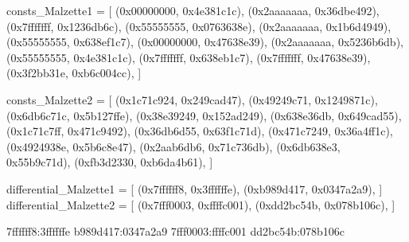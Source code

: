 consts_Malzette1 = [
    (0x00000000, 0x4e381c1c),
    (0x2aaaaaaa, 0x36dbe492),
    (0x7fffffff, 0x1236db6c),
    (0x55555555, 0x0763638e),
    (0x2aaaaaaa, 0x1b6d4949),
    (0x55555555, 0x638ef1c7),
    (0x00000000, 0x47638e39),
    (0x2aaaaaaa, 0x5236b6db),
    (0x55555555, 0x4e381c1c),
    (0x7fffffff, 0x638eb1c7),
    (0x7fffffff, 0x47638e39),
    (0x3f2bb31e, 0xb6c004cc),
]

consts_Malzette2 = [
    (0x1c71c924, 0x249cad47),
    (0x49249c71, 0x1249871c),
    (0x6db6c71c, 0x5b127ffe),
    (0x38e39249, 0x152ad249),
    (0x638e36db, 0x649cad55),
    (0x1c71c7ff, 0x471c9492),
    (0x36db6d55, 0x63f1c71d),
    (0x471c7249, 0x36a4ff1c),
    (0x4924938e, 0x5b6c8e47),
    (0x2aab6db6, 0x71c736db),
    (0x6db638e3, 0x55b9c71d),
    (0xfb3d2330, 0xb6da4b61),
]

differential_Malzette1 = [
    (0x7ffffff8, 0x3ffffffe),
    (0xb989d417, 0x0347a2a9),
]
differential_Malzette2 = [
    (0x7fff0003, 0xffffc001),
    (0xdd2bc54b, 0x078b106c),
]

7ffffff8:3ffffffe
b989d417:0347a2a9
7fff0003:ffffc001
dd2bc54b:078b106c
